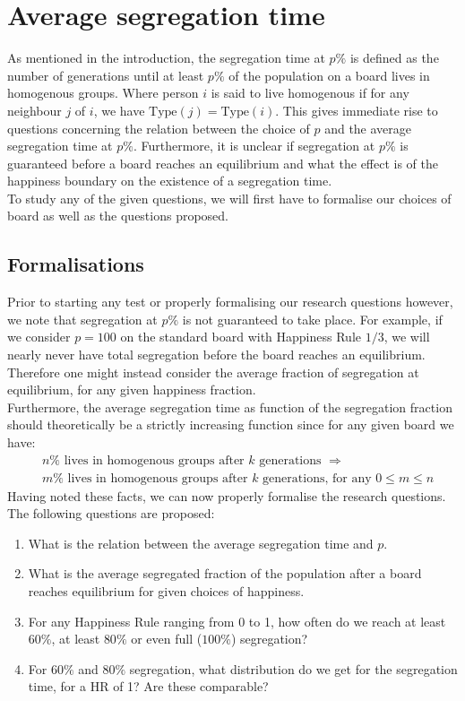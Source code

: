 
\section{Average segregation time}\label{sec:aveseg}
As mentioned in the introduction, the segregation time at \(p\%\) is defined as the number of generations until at least \(p\%\) of the population on a board lives in homogenous groups. 
Where person \(i\) is said to live homogenous if for any neighbour \(j\) of \(i\), we have \(\text{Type}(j)=\text{Type}(i)\).
This gives immediate rise to questions concerning the relation between the choice of \(p\) and the average segregation time at \(p\%\). 
Furthermore, it is unclear if segregation at \(p\%\) is guaranteed before a board reaches an equilibrium and what the effect is of the happiness boundary on the existence of a segregation time.\\

To study any of the given questions, we will first have to formalise our choices of board as well as the questions proposed.\\


\subsection{Formalisations}
Prior to starting any test or properly formalising our research questions however, we note that segregation at \(p\%\) is not guaranteed to take place.
For example, if we consider \(p=100\) on the standard board with Happiness Rule \(1/3\), we will nearly never have total segregation before the board reaches an equilibrium.
Therefore one might instead consider the average fraction of segregation at equilibrium, for any given happiness fraction. \\

Furthermore, the average segregation time as function of the segregation fraction should theoretically be a strictly increasing function since for any given board we have:
\begin{align*}
&n\% \text{ lives in homogenous groups after } k \text{ generations } \Rightarrow\\
& m\% \text{ lives in homogenous groups after } k \text{ generations, for any } 0 \leq m \leq n
\end{align*} 
Having noted these facts, we can now properly formalise the research questions.\\
The following questions are proposed:
\begin{enumerate}
 \item What is the relation between the average segregation time and \(p\).
 \item What is the average segregated fraction of the population after a board reaches equilibrium for given choices of happiness.
 \item For any Happiness Rule ranging from 0 to 1, how often do we reach at least $60\%$, at least $80\%$ or even full ($100\%$) segregation?
 \item For $60\%$ and $80\%$ segregation, what distribution do we get for the segregation time, for a  HR of  1? Are these comparable?
\end{enumerate}

